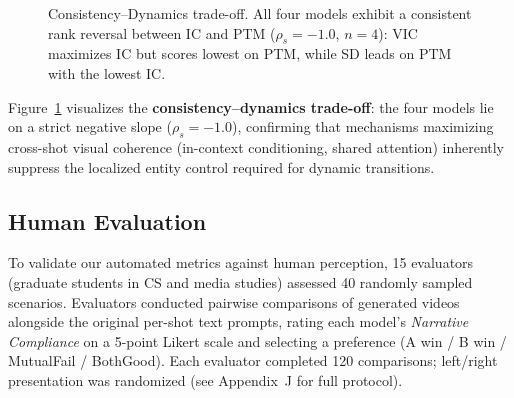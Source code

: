 \documentclass[sigconf,review,anonymous]{acmart}
\theoremstyle{definition}
\begin{document}
\begin{figure}[t]
\centering
{}
\caption{Consistency--Dynamics trade-off. All four models exhibit a consistent rank reversal between IC and PTM ($\rho_s = -1.0$, $n\!=\!4$): VIC maximizes IC but scores lowest on PTM, while SD leads on PTM with the lowest IC.}
\label{fig:pareto}
\end{figure}

Figure~\ref{fig:pareto} visualizes the \textbf{consistency--dynamics trade-off}: the four models lie on a strict negative slope ($\rho_s = -1.0$), confirming that mechanisms maximizing cross-shot visual coherence (in-context conditioning, shared attention) inherently suppress the localized entity control required for dynamic transitions.

\subsection{Human Evaluation}
\label{sec:human_eval}

To validate our automated metrics against human perception, 15 evaluators (graduate students in CS and media studies) assessed 40 randomly sampled scenarios. Evaluators conducted pairwise comparisons of generated videos alongside the original per-shot text prompts, rating each model's \emph{Narrative Compliance} on a 5-point Likert scale and selecting a preference (A win / B win / MutualFail / BothGood). Each evaluator completed 120 comparisons; left/right presentation was randomized (see Appendix~J for full protocol).
\end{document}
